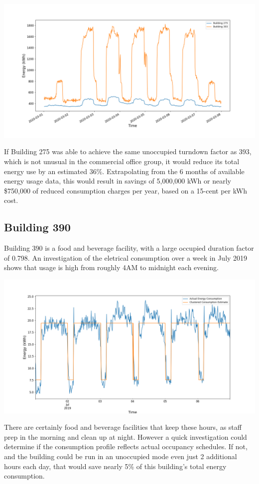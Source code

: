 \documentclass[a4paper]{article}
\begin{document}
\includegraphics[width=.8\columnwidth]{./images/275v393_Turndown.png}

If Building 275 was able to achieve the same unoccupied turndown factor as 393, which is not unusual in the commercial office group, it would reduce its total energy use by an estimated 36\%. Extrapolating from the 6 months of available energy usage data, this would result in savings of 5,000,000 kWh or nearly \$750,000 of reduced consumption charges per year, based on a 15-cent per kWh cost.

\subsection{Building 390}

Building 390 is a food and beverage facility, with a large occupied duration factor of 0.798. An investigation of the eletrical consumption over a week in July 2019 shows that usage is high from roughly 4AM to midnight each evening.

\includegraphics[width=.8\columnwidth]{./images/390_Duration.png}

There are certainly food and beverage facilities that keep these hours, as staff prep in the morning and clean up at night. However a quick investigation could determine if the consumption profile reflects actual occupancy schedules. If not, and the building could be run in an unoccupied mode even just 2 additional hours each day, that would save nearly 5\% of this building's total energy consumption.
\end{document}
